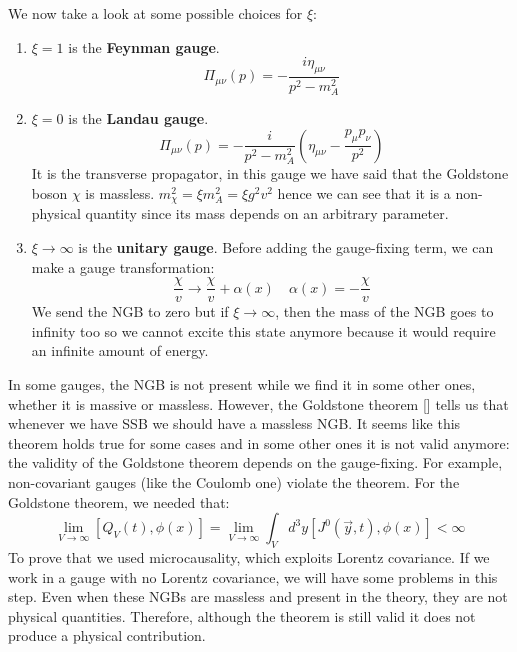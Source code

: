 \documentclass[../main.tex]{subfiles}
\begin{document}
We now take a look at some possible choices for $\xi$:
\begin{enumerate}
    \item $\xi=1$ is the \textbf{Feynman gauge}.
    \[
    \Pi_{\mu\nu}(p)=-\frac{i\eta_{\mu\nu}}{p^2-m_A^2}
    \]
    \item $\xi=0$ is the \textbf{Landau gauge}.
    \[
    \Pi_{\mu\nu}(p)=-\frac{i}{p^2-m_A^2}\left(\eta_{\mu\nu}-\frac{p_\mu p_\nu}{p^2}\right)
    \]
    It is the transverse propagator, in this gauge we have said that the Goldstone boson $\chi$ is massless. $m_\chi^2=\xi m_A^2=\xi g^2v^2$ hence we can see that it is a non-physical quantity since its mass depends on an arbitrary parameter.
    \item $\xi\to\infty$ is the \textbf{unitary gauge}. Before adding the gauge-fixing term, we can make a gauge transformation:
    \[
    \frac{\chi}{v}\to\frac{\chi}{v}+\alpha(x) \quad \alpha(x)=-\frac{\chi}{v} 
    \]
    We send the NGB to zero but if $\xi\to\infty$, then the mass of the NGB goes to infinity too so we cannot excite this state anymore because it would require an infinite amount of energy.
\end{enumerate}
In some gauges, the NGB is not present while we find it in some other ones, whether it is massive or massless. However, the Goldstone theorem [] tells us that whenever we have SSB we should have a massless NGB. It seems like this theorem holds true for some cases and in some other ones it is not valid anymore: the validity of the Goldstone theorem depends on the gauge-fixing. For example, non-covariant gauges (like the Coulomb one) violate the theorem. For the Goldstone theorem, we needed that:
\[
\lim_{V\to\infty}[Q_V(t),\phi(x)]=\lim_{V\to\infty}\int_Vd^3y[J^0(\Vec{y},t),\phi(x)]<\infty
\]
To prove that we used microcausality, which exploits Lorentz covariance. If we work in a gauge with no Lorentz covariance, we will have some problems in this step. Even when these NGBs are massless and present in the theory, they are not physical quantities. Therefore, although the theorem is still valid it does not produce a physical contribution.\\
\end{document}
